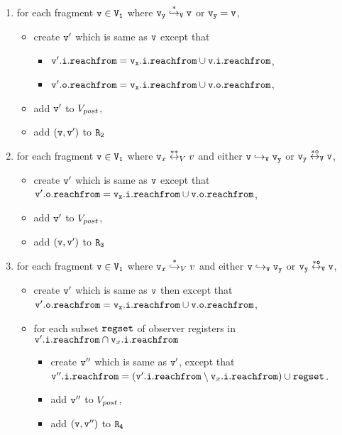 \begin{itemize}
\begin{enumerate}
\item for each fragment $\tt v \in V_1$ where $\tt \mathtt{v}_y \overset{*}\hookrightarrow_{V} v$ or $\tt \mathtt{v}_y = v$, 
\begin{itemize}
	\item create  $\tt v'$ which is same as $\tt v$ except that
\begin{itemize}
 \item $\tt \mathtt{v}'.\mathtt{i}.\mathtt{reachfrom} = \mathtt{v}_x.\mathtt{i}.\mathtt{reachfrom} \cup \tt \mathtt{v}.\mathtt{i}.\mathtt{reachfrom}$, 
\item $\tt \mathtt{v}'.\mathtt{o}.\mathtt{reachfrom} = \mathtt{v}_x.\mathtt{i}.\mathtt{reachfrom} \cup \tt \mathtt{v}.\mathtt{o}.\mathtt{reachfrom}$, 
\end{itemize}
\item add $\tt v'$ to $V_{post}$,
\item add $\tt (v,v')$ to $\tt R_2$
\end{itemize}
\item for each fragment $\tt v \in V_1$ where $\mathtt{v}_x \overset{**}\leftrightarrow_{V} v$ and either $\tt v \hookrightarrow_{V} \mathtt{v}_y$ or $\tt \mathtt{v}_y \overset{*o}\leftrightarrow_{V} v$, 
\begin{itemize}
\item  create $\tt v'$ which is same as $\tt v$ except that $\tt \mathtt{v}'.\mathtt{o}.\mathtt{reachfrom} = \mathtt{v}_x.\mathtt{i}.\mathtt{reachfrom} \cup \tt \mathtt{v}.\mathtt{o}.\mathtt{reachfrom}$, 
 \item add $\tt v'$ to $V_{post}$, 
 \item add $\tt (v,v')$ to $\tt R_3$

\end{itemize}


\item for each fragment $\tt v \in V_1$ where $\mathtt{v}_x \overset{*}\hookrightarrow_{V} v$ and either $\tt v \hookrightarrow_{V} \mathtt{v}_y$ or $\tt \mathtt{v}_y \overset{*o}\leftrightarrow_{V} v$,  
\begin{itemize}
\item create $\tt v'$ which is same as $\tt v$ then except that $\tt \mathtt{v}'.\mathtt{o}.\mathtt{reachfrom} = \mathtt{v}_x.\mathtt{i}.\mathtt{reachfrom} \cup \tt \mathtt{v}.\mathtt{o}.\mathtt{reachfrom}$, 
\item for each subset $\mathtt{regset}$ of observer registers in $\mathtt{v}'.\mathtt{i}.\mathtt{reachfrom} \cap \mathtt{v}_x.\mathtt{i}.\mathtt{reachfrom}$
\begin{itemize}
\item create $\tt v''$ which is same as $\tt v'$, except that $\mathtt{v}''.\mathtt{i}.\mathtt{reachfrom} = (\mathtt{v}'.\mathtt{i}.\mathtt{reachfrom} \setminus \mathtt{v}_x.\mathtt{i}.\mathtt{reachfrom}) \cup \mathtt{regset}$.
\item add $\tt v''$ to $V_{post}$,
\item add $\tt (v,v'')$ to $\tt R_4$
\end{itemize}
\end{itemize}


\end{enumerate}
\end{itemize}
